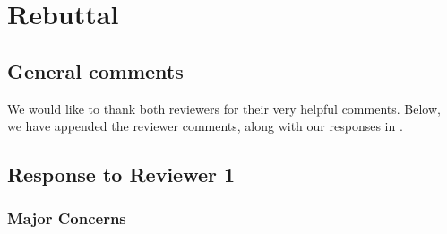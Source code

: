 % 
% 
% 
% 
% 
% 

\section*{Rebuttal} %
\label{sec:general_rebuttal}


\setcounter{subsection}{0}
\subsection*{General comments} %
\label{sub:general_comments}

We would like to thank both reviewers for their very helpful comments.  Below, we have appended the reviewer comments, along with our responses in .  

\subsection{Response to Reviewer 1} %
\label{sec:response_to_reviewer_1}


% 

\subsubsection{Major Concerns} %
\label{ssub:major_concerns}

